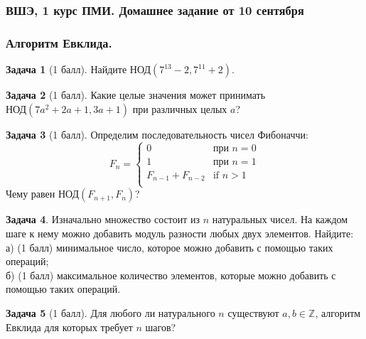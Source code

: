 \documentclass[12pt, fleqn]{extarticle}
\newcommand{\integer}{\mathbb{Z}}
\theoremstyle{definition}
\newtheorem{problem}{Задача}
\theoremstyle{remark}
\begin{document}
\clearpage
\thispagestyle{empty}
\subsubsection*{ВШЭ, 1 курс ПМИ. Домашнее задание от 10 сентября}

\subsubsection*{Алгоритм Евклида.}

\begin{problem}[1 балл]
Найдите $\text{НОД}(7^{13} - 2,7^{11} + 2)$.
\end{problem}

\begin{problem}[1 балл]
Какие целые значения может принимать
$\text{НОД}(7a^{2} + 2a + 1,3a + 1)$
при различных целых $a$?
\end{problem}


\begin{problem}[1 балл]
Определим последовательность чисел Фибоначчи:
$$
F_{n} =
\begin{cases}
0 & \text{при } n = 0 \\
1 & \text{при } n = 1\\
F_{n - 1} + F_{n - 2} & \text{if } n > 1\\
\end{cases}
$$
Чему равен $\text{НОД}(F_{n + 1}, F_{n})$?
\end{problem}

\begin{problem}
Изначально множество состоит из $n$ натуральных чисел.
На каждом шаге к нему можно добавить модуль разности любых двух элементов. 
Найдите:\\
а) (1 балл) минимальное число, которое можно добавить с помощью таких операций;\\
б) (1 балл) максимальное количество элементов, которые можно добавить с помощью таких операций.
\end{problem}

\begin{problem}[1 балл]
Для любого ли натурального $n$
существуют $a, b \in \integer$,
алгоритм Евклида для которых требует $n$ шагов?
\end{problem}
\end{document}
